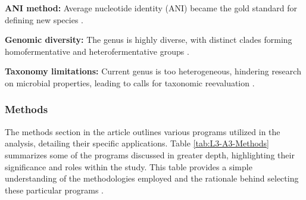 \textbf{ANI method:} Average nucleotide identity (ANI) became the gold standard for defining new species \cite*{L3-TaxNotes}.

\textbf{Genomic diversity:} The genus is highly diverse, with distinct clades forming homofermentative and heterofermentative groups \cite*{L3-TaxNotes}.

\textbf{Taxonomy limitations:} Current genus is too heterogeneous, hindering research on microbial properties, leading to calls for taxonomic reevaluation \cite*{L3-TaxNotes}.

\subsubsection{Methods}
The methods section in the article outlines various programs utilized in the analysis, detailing their specific applications. Table \ref*{tab:L3-A3-Methods} summarizes some of the programs discussed in greater depth, highlighting their significance and roles within the study. This table provides a simple understanding of the methodologies employed and the rationale behind selecting these particular programs \cite*{L3-TaxNotes}.
